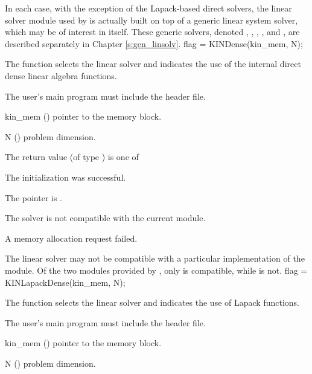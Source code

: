 In each case, with the exception of the Lapack-based direct solvers,
the linear solver module used by {\kinsol} is actually built
on top of a generic linear system solver, which may be of interest in itself.
These generic solvers, denoted {\dense}, {\band}, {\spgmr}, {\spbcg}, and {\sptfqmr},
are described separately in Chapter \ref{s:gen_linsolv}.
{
  flag = KINDense(kin\_mem, N);
}
{
  The function  selects the {\kindense} linear solver and indicates
  the use of the internal direct dense linear algebra functions. 

  The user's main program must include the  header file.
}
{
  \begin{args}
  \item[kin\_mem] ()
    pointer to the {\kinsol} memory block.
  \item[N] ()
    problem dimension.
  \end{args}
}
{
  The return value  (of type ) is one of
  \begin{args}
  \item[\Id{KINDLS\_SUCCESS}] 
    The {\kindense} initialization was successful.
  \item[\Id{KINDLS\_MEM\_NULL}]
    The  pointer is .
  \item[\Id{KINDLS\_ILL\_INPUT}]
    The {\kindense} solver is not compatible with the current {\nvector} module.
  \item[\Id{KINDLS\_MEM\_FAIL}]
    A memory allocation request failed.
  \end{args}
}
{
  The {\kindense} linear solver may not be compatible with a particular
  implementation of the {\nvector} module. 
  Of the two {\nvector} modules provided by {\sundials}, only {\nvecs} is 
  compatible, while {\nvecp} is not.
}
{
  flag = KINLapackDense(kin\_mem, N);
}
{
  The function  selects the {\kindense} linear solver and 
  indicates the use of Lapack functions. 

  The user's main program must include the  header file.
}
{
  \begin{args}
  \item[kin\_mem] ()
    pointer to the {\kinsol} memory block.
  \item[N] ()
    problem dimension.
  \end{args}
}
